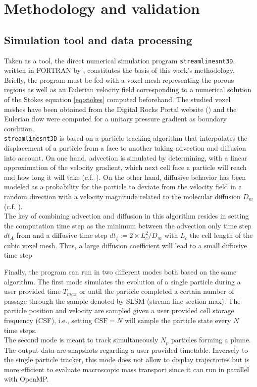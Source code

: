 \chapter{Methodology and validation}
\section{Simulation tool and data processing}
Taken as a tool, the direct numerical simulation program \texttt{streamlinesnt3D}, written in \textsc{FORTRAN} by \citet{Meyer2017}, constitutes the basis of this work's methodology. 
Briefly, the program must be fed with a voxel mesh representing the porous regions as well as an Eulerian velocity field corresponding to a numerical solution of the Stokes equation \eqref{eq:stokes} computed beforehand.
The studied voxel meshes have been obtained from the Digital Rocks Portal website (\citet{digitalrocksportal}) and the Eulerian flow were computed for a unitary pressure gradient as boundary condition.\\

\texttt{streamlinesnt3D} is based on a particle tracking algorithm that interpolates the displacement of a particle from a face to another taking advection and diffusion into account.
On one hand, advection is simulated by determining, with a linear approximation of the velocity gradient, which next cell face a particle will reach and how long it will take (c.f. \cite{Pollock1988}).
On the other hand, diffusive behavior has been modeled as a probability for the particle to deviate from the velocity field in a random direction with a velocity magnitude related to the molecular diffusion $D_m$ (c.f. \citet{Meyer2017}).\\
The key of combining advection and diffusion in this algorithm resides in setting the computation time step as the minimum between the advection only time step $dt_A$ from \citet{Pollock1988} and a diffusive time step $dt_\zeta:=2\times L_c^2/D_m$ with $L_c$ the cell length of the cubic voxel mesh.
Thus, a large diffusion coefficient will lead to a small diffusive time step 

Finally, the program can run in two different modes both based on the same algorithm.
The first mode simulates the evolution of a single particle during a user provided time $T_{max}$ or until the particle completed a certain number of passage through the sample denoted by SLSM (stream line section max). 
The particle position and velocity are sampled given a user provided cell storage frequency (CSF), i.e., setting $\mathrm{CSF}=N$ will sample the particle state every $N$ time steps.\\
The second mode is meant to track simultaneously $N_p$ particles forming a plume. The output data are snapshots regarding a user provided timetable. 
Inversely to the single particle tracker, this mode does not allow to display trajectories but is more efficient to evaluate macroscopic mass transport since it can run in parallel with OpenMP.

